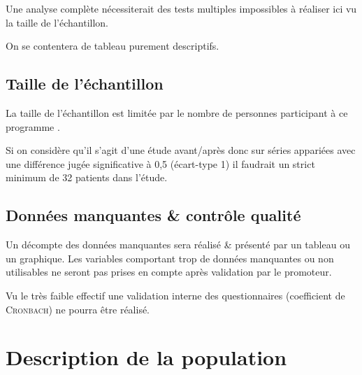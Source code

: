\documentclass[
  a4paper,
  french,
  fontsize=10pt,
  oneside]{scrartcl}
\begin{document}
\begin{tcolorbox}[enhanced jigsaw, colbacktitle=quarto-callout-warning-color!10!white, opacityback=0, toprule=.15mm, leftrule=.75mm, colback=white, toptitle=1mm, colframe=quarto-callout-warning-color-frame, titlerule=0mm, left=2mm, bottomtitle=1mm, title=\textcolor{quarto-callout-warning-color}{\faExclamationTriangle}\hspace{0.5em}{Avertissement}, coltitle=black, arc=.35mm, rightrule=.15mm, bottomrule=.15mm, breakable, opacitybacktitle=0.6]

Une analyse complète nécessiterait des tests multiples impossibles à
réaliser ici vu la taille de l'échantillon.

On se contentera de tableau purement descriptifs.

\end{tcolorbox}

\hypertarget{taille-de-luxe9chantillon}{%
\subsection{Taille de l'échantillon}\label{taille-de-luxe9chantillon}}

La taille de l'échantillon est limitée par le nombre de personnes
participant à ce programme .

Si on considère qu'il s'agit d'une étude avant/après donc sur séries
appariées avec une différence jugée significative à 0,5 (écart-type
1)
il faudrait un strict minimum de 32 patients dans l'étude.

\hypertarget{donnuxe9es-manquantes-contruxf4le-qualituxe9}{%
\subsection{Données manquantes \& contrôle
qualité}\label{donnuxe9es-manquantes-contruxf4le-qualituxe9}}

Un décompte des données manquantes sera réalisé \& présenté par un
tableau ou un graphique. Les variables comportant trop de données
manquantes ou non utilisables ne seront pas prises en compte après
validation par le promoteur.

Vu le très faible effectif une validation interne des questionnaires
(coefficient \textalpha{} de \textsc{Cronbach}) ne pourra être réalisé.

\hypertarget{description-de-la-population}{%
\section{Description de la
population}\label{description-de-la-population}}
\end{document}
